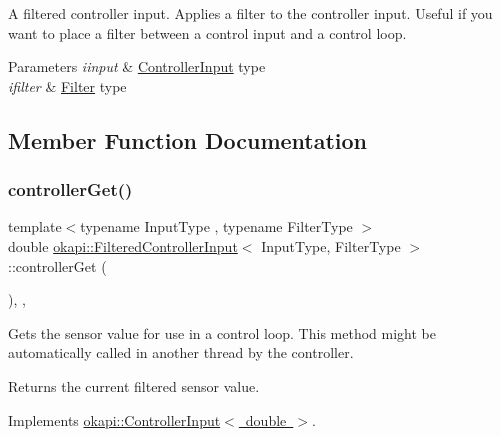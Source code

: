 A filtered controller input. Applies a filter to the controller input. Useful if you want to place a filter between a control input and a control loop.


\begin{DoxyParams}{Parameters}
{\em iinput} & \mbox{\hyperlink{classokapi_1_1ControllerInput}{Controller\+Input}} type \\
\hline
{\em ifilter} & \mbox{\hyperlink{classokapi_1_1Filter}{Filter}} type \\
\hline
\end{DoxyParams}


\subsection{Member Function Documentation}
\mbox{\label{classokapi_1_1FilteredControllerInput_abc48c2eb875b0e927d0fd6b462d391d6}} 
\subsubsection{\texorpdfstring{controllerGet()}{controllerGet()}}
{\footnotesize\ttfamily template$<$typename Input\+Type , typename Filter\+Type $>$ \\
double \mbox{\hyperlink{classokapi_1_1FilteredControllerInput}{okapi\+::\+Filtered\+Controller\+Input}}$<$ Input\+Type, Filter\+Type $>$\+::controller\+Get (\begin{DoxyParamCaption}{ }\end{DoxyParamCaption})\hspace{0.3cm}{\ttfamily [inline]}, {\ttfamily [override]}, {\ttfamily [virtual]}}

Gets the sensor value for use in a control loop. This method might be automatically called in another thread by the controller.

\begin{DoxyReturn}{Returns}
the current filtered sensor value. 
\end{DoxyReturn}


Implements \mbox{\hyperlink{classokapi_1_1ControllerInput_a3c6c86d897983f367928a93890551e17}{okapi\+::\+Controller\+Input$<$ double $>$}}.



